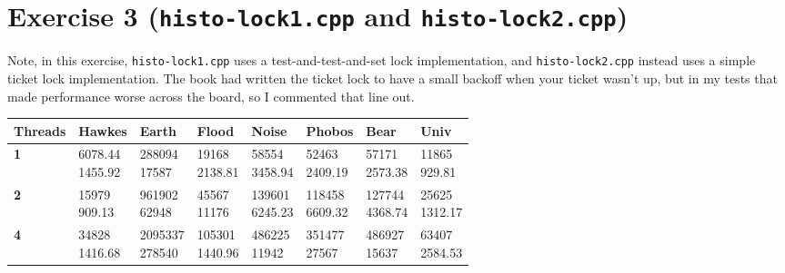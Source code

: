 \documentclass[letterpaper]{article}
\begin{document}
	\section*{Exercise 3 (\texttt{histo-lock1.cpp} and \texttt{histo-lock2.cpp})}

	Note, in this exercise, \texttt{histo-lock1.cpp} uses a test-and-test-and-set lock implementation, and \texttt{histo-lock2.cpp} instead uses a simple ticket lock implementation. The book had written the ticket lock to have a small backoff when your ticket wasn't up, but in my tests that made performance worse across the board, so I commented that line out.

	\begin{center}
	\begin{tabular}{ |m{5em}|m{5em}|m{5em}|m{5em}|m{5em}|m{5em}|m{5em}|m{5em}| }
	\hline
	\textbf{Threads} & \textbf{Hawkes} & \textbf{Earth} & \textbf{Flood} & \textbf{Noise} & \textbf{Phobos} & \textbf{Bear} & \textbf{Univ} \\ \hline
	\textbf{1}& \makecell{6078.44 \\[-0.5em] 1455.92}& \makecell{288094 \\[-0.5em] 17587}& \makecell{19168 \\[-0.5em] 2138.81}& \makecell{58554 \\[-0.5em] 3458.94}& \makecell{52463 \\[-0.5em] 2409.19}& \makecell{57171 \\[-0.5em] 2573.38}& \makecell{11865 \\[-0.5em] 929.81}\\ \hline
	\textbf{2}& \makecell{15979 \\[-0.5em] 909.13}& \makecell{961902 \\[-0.5em] 62948}& \makecell{45567 \\[-0.5em] 11176}& \makecell{139601 \\[-0.5em] 6245.23}& \makecell{118458 \\[-0.5em] 6609.32}& \makecell{127744 \\[-0.5em] 4368.74}& \makecell{25625 \\[-0.5em] 1312.17}\\ \hline
	\textbf{4}& \makecell{34828 \\[-0.5em] 1416.68}& \makecell{2095337 \\[-0.5em] 278540}& \makecell{105301 \\[-0.5em] 1440.96}& \makecell{486225 \\[-0.5em] 11942}& \makecell{351477 \\[-0.5em] 27567}& \makecell{486927 \\[-0.5em] 15637}& \makecell{63407 \\[-0.5em] 2584.53}\\ \hline

\end{tabular}
\end{center}
\end{document}
